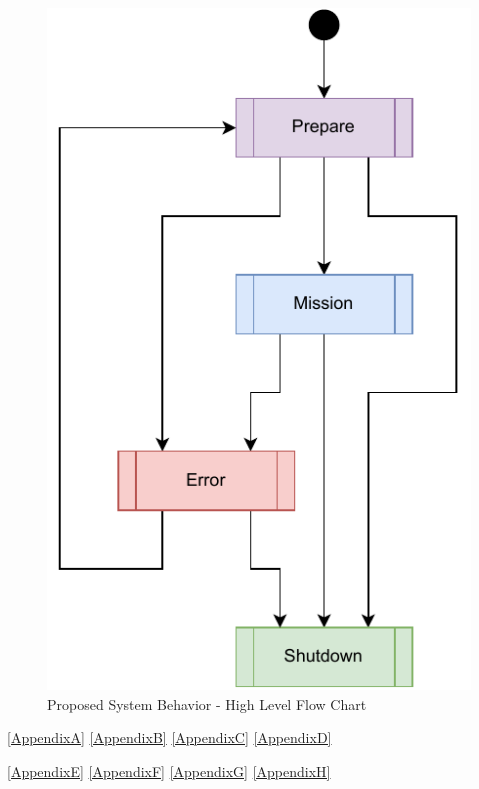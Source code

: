 \begin{figure}[H]
    \centering
    \includegraphics[scale=0.8]{ch3/assets/MDU_MAIN.pdf}
    \caption{Proposed System Behavior - High Level Flow Chart}
    \label{fig:MDU_MAIN}
\end{figure}

\ref{AppendixA}
\ref{AppendixB}
\ref{AppendixC}
\ref{AppendixD}

\ref{AppendixE}
\ref{AppendixF}
\ref{AppendixG}
\ref{AppendixH}
